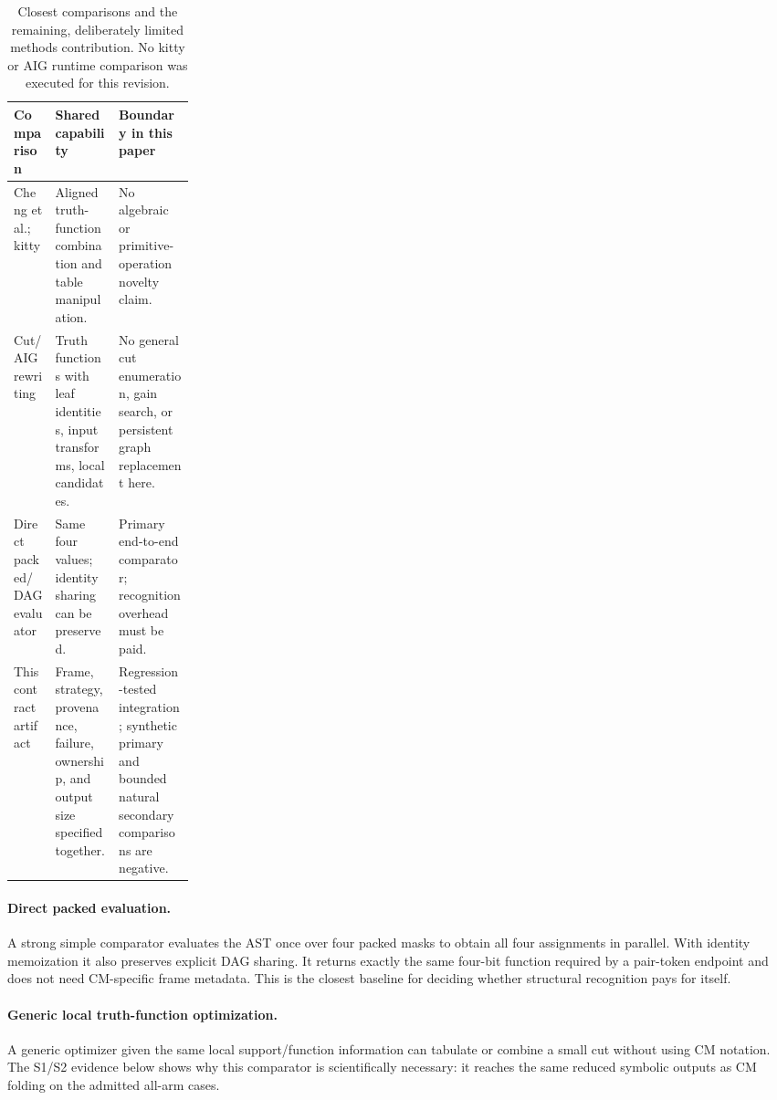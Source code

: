 \documentclass[10pt]{article}
\theoremstyle{plain}
\theoremstyle{definition}
\theoremstyle{remark}
\begin{document}
\begin{table}[H]
\small\centering
\begin{tabularx}{\linewidth}{@{}p{0.23\linewidth}XX@{}}
\toprule
\textbf{Comparison} & \textbf{Shared capability} & \textbf{Boundary in this paper}\\
\midrule
Cheng et al.; kitty & Aligned truth-function combination and table manipulation. & No algebraic or primitive-operation novelty claim.\\
Cut/AIG rewriting & Truth functions with leaf identities, input transforms, local candidates. & No general cut enumeration, gain search, or persistent graph replacement here.\\
Direct packed/DAG evaluator & Same four values; identity sharing can be preserved. & Primary end-to-end comparator; recognition overhead must be paid.\\
This contract artifact & Frame, strategy, provenance, failure, ownership, and output size specified together. & Regression-tested integration; synthetic primary and bounded natural secondary comparisons are negative.\\
\bottomrule
\end{tabularx}
\caption{Closest comparisons and the remaining, deliberately limited methods contribution. No kitty or AIG runtime comparison was executed for this revision.}
\end{table}

\paragraph{Direct packed evaluation.}
A strong simple comparator evaluates the AST once over four packed masks to obtain all four assignments in parallel. With identity memoization it also preserves explicit DAG sharing. It returns exactly the same four-bit function required by a pair-token endpoint and does not need CM-specific frame metadata. This is the closest baseline for deciding whether structural recognition pays for itself.

\paragraph{Generic local truth-function optimization.}
A generic optimizer given the same local support/function information can tabulate or combine a small cut without using CM notation. The S1/S2 evidence below shows why this comparator is scientifically necessary: it reaches the same reduced symbolic outputs as CM folding on the admitted all-arm cases.
\end{document}
